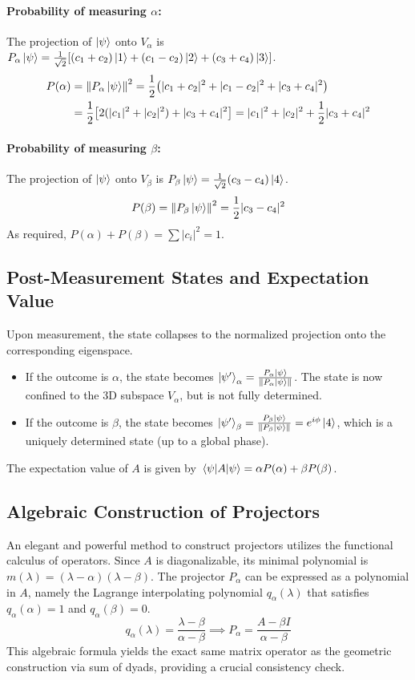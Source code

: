 \documentclass[11pt,a4paper]{article}
\begin{document}
\paragraph{Probability of measuring $\alpha$:}
The projection of $\ket{\psi}$ onto $V_\alpha$ is $P_\alpha \ket{\psi} = \frac{1}{\sqrt{2}} [ (c_1+c_2)\ket{1} + (c_1-c_2)\ket{2} + (c_3+c_4)\ket{3} ]$.
\begin{align*}
P(\alpha) &= \norm{P_\alpha \ket{\psi}}^2 = \frac{1}{2} \qty( |c_1+c_2|^2 + |c_1-c_2|^2 + |c_3+c_4|^2 ) \\
&= \frac{1}{2} \qty[ 2(|c_1|^2 + |c_2|^2) + |c_3+c_4|^2 ] = |c_1|^2 + |c_2|^2 + \frac{1}{2}|c_3+c_4|^2
\end{align*}

\paragraph{Probability of measuring $\beta$:}
The projection of $\ket{\psi}$ onto $V_\beta$ is $P_\beta \ket{\psi} = \frac{1}{\sqrt{2}} (c_3-c_4)\ket{4}$.
$$
P(\beta) = \norm{P_\beta \ket{\psi}}^2 = \frac{1}{2} |c_3-c_4|^2
$$
As required, $P(\alpha) + P(\beta) = \sum |c_i|^2 = 1$.

\subsection{Post-Measurement States and Expectation Value}
Upon measurement, the state collapses to the normalized projection onto the corresponding eigenspace.
\begin{itemize}
    \item If the outcome is $\alpha$, the state becomes $\ket{\psi'}_\alpha = \frac{P_\alpha \ket{\psi}}{\norm{P_\alpha \ket{\psi}}}$. The state is now confined to the 3D subspace $V_\alpha$, but is not fully determined.
    \item If the outcome is $\beta$, the state becomes $\ket{\psi'}_\beta = \frac{P_\beta \ket{\psi}}{\norm{P_\beta \ket{\psi}}} = e^{i\phi}\ket{4}$, which is a uniquely determined state (up to a global phase).
\end{itemize}
The expectation value of $A$ is given by $\expval{A}{\psi} = \alpha P(\alpha) + \beta P(\beta)$.

\subsection{Algebraic Construction of Projectors}
An elegant and powerful method to construct projectors utilizes the functional calculus of operators. Since $A$ is diagonalizable, its minimal polynomial is $m(\lambda) = (\lambda-\alpha)(\lambda-\beta)$. The projector $P_\alpha$ can be expressed as a polynomial in $A$, namely the Lagrange interpolating polynomial $q_\alpha(\lambda)$ that satisfies $q_\alpha(\alpha)=1$ and $q_\alpha(\beta)=0$.
$$
q_\alpha(\lambda) = \frac{\lambda - \beta}{\alpha - \beta} \implies P_\alpha = \frac{A - \beta I}{\alpha - \beta}
$$
This algebraic formula yields the exact same matrix operator as the geometric construction via sum of dyads, providing a crucial consistency check.
\end{document}
